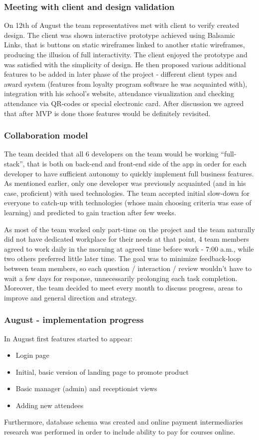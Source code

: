 \documentclass{article}
\begin{document}
\subsubsection{Meeting with client and design validation}
On 12th of August the team representatives met with client to verify created design. The client was shown interactive prototype achieved using Balsamic Links, that is buttons on static wireframes linked to another static wireframes, producing the illusion of full interactivity. The client enjoyed the prototype and was satisfied with the simplicity of design. He then proposed various additional features to be added in later phase of the project - different client types and award system (features from loyalty program software he was acquainted with), integration with his school's website, attendance visualization and checking attendance via QR-codes or special electronic card. After discussion we agreed that after MVP is done those features would be definitely revisited.

\subsubsection{Collaboration model}
The team decided that all 6 developers on the team would be working ``full-stack'', that is both on back-end and front-end side of the app in order for each developer to have sufficient autonomy to quickly implement full business features. As mentioned earlier, only one developer was previously acquainted (and in his case, proficient) with used technologies. The team accepted initial slow-down for everyone to catch-up with technologies (whose main choosing criteria was ease of learning) and predicted to gain traction after few weeks.

As most of the team worked only part-time on the project and the team naturally did not have dedicated workplace for their needs at that point, 4 team members agreed to work daily in the morning at agreed time before work - 7:00 a.m., while two others preferred little later time. The goal was to minimize feedback-loop between team members, so each question / interaction / review wouldn't have to wait a few days for response, unnecessarily prolonging each task completion. Moreover, the team decided to meet every month to discuss progress, areas to improve and general direction and strategy.

\subsubsection{August - implementation progress}
In August first features started to appear:
\begin{itemize}
\item Login page
\item Initial, basic version of landing page to promote product
\item Basic manager (admin) and receptionist views
\item Adding new attendees
\end{itemize}
Furthermore, database schema was created and online payment intermediaries research was performed in order to include ability to pay for courses online.
\end{document}
